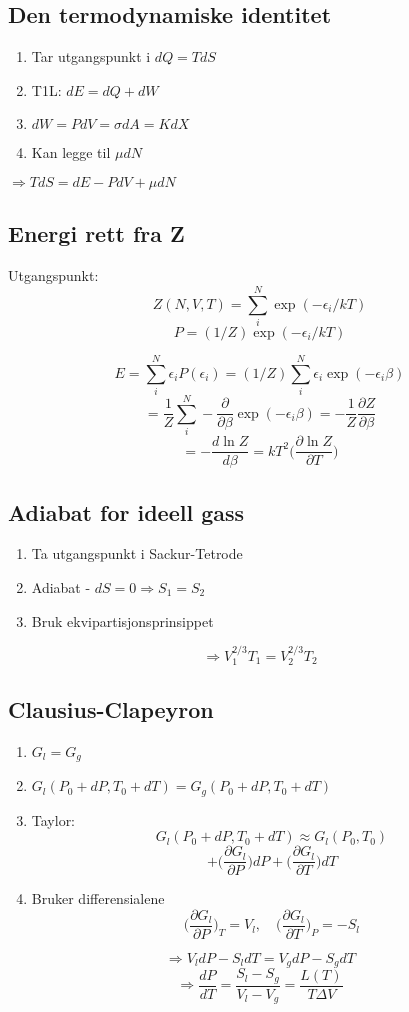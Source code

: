 \documentclass{article}
\begin{document}
\begin{multicols}{2}
\subsection*{Den termodynamiske identitet}
\begin{enumerate}
\item Tar utgangspunkt i $dQ=TdS$
\item T1L: $dE=dQ+dW$
\item $dW=PdV=\sigma dA=KdX$
\item Kan legge til $\mu dN$
\end{enumerate}
$\Rightarrow TdS=dE-PdV+\mu dN$

\subsection*{Energi rett fra Z}
Utgangspunkt:
$$Z(N,V,T)=\sum_i^N \exp(-\epsilon_i/kT)$$
$$P=(1/Z)\exp(-\epsilon_i/kT)$$

$$E=\sum_i^N\epsilon_i P(\epsilon_i)=(1/Z)\sum_i^N\epsilon_i\exp(-\epsilon_i\beta)$$
$$=\frac{1}{Z}\sum_i^N-\frac{\partial}{\partial\beta}\exp(-\epsilon_i\beta)=-\frac{1}{Z}\frac{\partial Z}{\partial\beta}$$
$$=-\frac{d\ln Z}{d\beta}=kT^2\bigg(\frac{\partial\ln Z}{\partial T}\bigg)$$

\subsection*{Adiabat for ideell gass}
\begin{enumerate}
\item Ta utgangspunkt i Sackur-Tetrode
\item Adiabat - $dS=0 \Rightarrow S_1=S_2$
\item Bruk ekvipartisjonsprinsippet
\end{enumerate}
$$\Rightarrow V_1^{2/3}T_1=V_2^{2/3}T_2$$

\subsection*{Clausius-Clapeyron}
\begin{enumerate}
\item $G_l=G_g$
\item $G_l(P_0+dP,T_0+dT)=G_g(P_0+dP,T_0+dT)$
\item Taylor: 
$$G_l(P_0+dP,T_0+dT)\approx G_l(P_0,T_0)$$
$$+\bigg(\frac{\partial G_l}{\partial P}\bigg)dP+\bigg(\frac{\partial G_l}{\partial T}\bigg)dT$$
\item Bruker differensialene
$$\bigg(\frac{\partial G_l}{\partial P}\bigg)_T=V_l,\quad\bigg(\frac{\partial G_l}{\partial T}\bigg)_P=-S_l$$
\end{enumerate}
$$\Rightarrow V_ldP-S_ldT=V_gdP-S_gdT$$
$$\Rightarrow \frac{dP}{dT}=\frac{S_l-S_g}{V_l-V_g}=\frac{L(T)}{T\Delta V}$$


\end{multicols}
\end{document}
